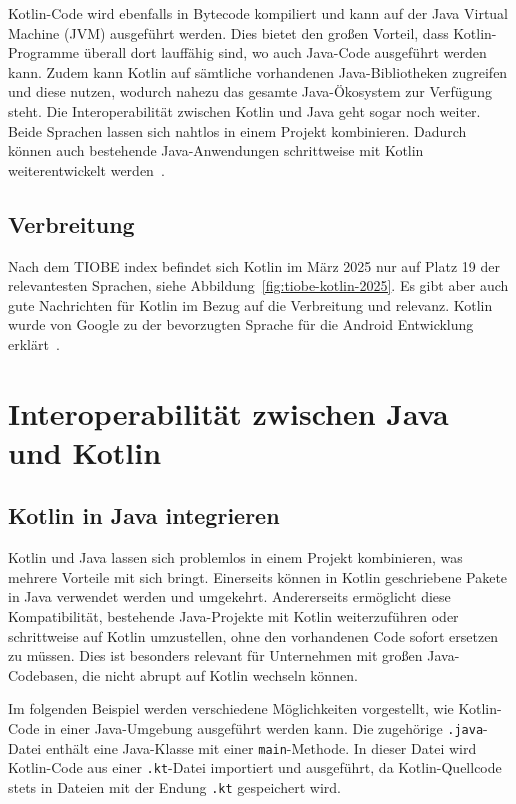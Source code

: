 \documentclass[11pt]{article}
\begin{document}
    Kotlin-Code wird ebenfalls in Bytecode kompiliert und kann auf der Java Virtual Machine (JVM) ausgeführt werden.
    Dies bietet den großen Vorteil, dass Kotlin-Programme überall dort lauffähig sind, wo auch Java-Code ausgeführt werden kann.
    Zudem kann Kotlin auf sämtliche vorhandenen Java-Bibliotheken zugreifen und diese nutzen, wodurch nahezu das gesamte Java-Ökosystem zur Verfügung steht.
    Die Interoperabilität zwischen Kotlin und Java geht sogar noch weiter.
    Beide Sprachen lassen sich nahtlos in einem Projekt kombinieren.
    Dadurch können auch bestehende Java-Anwendungen schrittweise mit Kotlin weiterentwickelt werden~\cite[19-20]{kotlin-handbuch}.

    \subsection{Verbreitung}
    Nach dem TIOBE index befindet sich Kotlin im März 2025 nur auf Platz 19 der relevantesten Sprachen, siehe Abbildung~\ref{fig:tiobe-kotlin-2025}.
    Es gibt aber auch gute Nachrichten für Kotlin im Bezug auf die Verbreitung und relevanz.
    Kotlin wurde von Google zu der bevorzugten Sprache für die Android Entwicklung erklärt~\cite{tn3-google}.

    \section{Interoperabilität zwischen Java und Kotlin}

    \subsection{Kotlin in Java integrieren}
    Kotlin und Java lassen sich problemlos in einem Projekt kombinieren, was mehrere Vorteile mit sich bringt.
    Einerseits können in Kotlin geschriebene Pakete in Java verwendet werden und umgekehrt.
    Andererseits ermöglicht diese Kompatibilität, bestehende Java-Projekte mit Kotlin weiterzuführen oder
    schrittweise auf Kotlin umzustellen, ohne den vorhandenen Code sofort ersetzen zu müssen.
    Dies ist besonders relevant für Unternehmen mit großen Java-Codebasen, die nicht abrupt auf Kotlin wechseln können. \cite[20]{kotlin-handbuch}

    Im folgenden Beispiel werden verschiedene Möglichkeiten vorgestellt, wie Kotlin-Code in einer Java-Umgebung ausgeführt
    werden kann. Die zugehörige \texttt{.java}-Datei enthält eine Java-Klasse mit einer \texttt{main}-Methode.
    In dieser Datei wird Kotlin-Code aus einer \texttt{.kt}-Datei importiert und ausgeführt, da Kotlin-Quellcode stets
    in Dateien mit der Endung \texttt{.kt} gespeichert wird.
\end{document}
